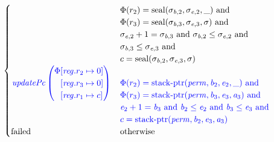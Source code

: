\documentclass[a4paper]{article}
\begin{document}
\begin{align*}
\begin{cases}
&
                                \arraycolsep=0pt
                                \begin{array}[t]{l}
                                  \Phi(r_2) = \seal{\sigma_{\baddr,2},\sigma_{\eaddr,2},\_} \tand \\
                                  \Phi(r_3) = \seal{\sigma_{\baddr,3},\sigma_{\eaddr,3},\sigma} \tand \\
                                  \sigma_{\eaddr,2}+1 = \sigma_{\baddr,3} \tand \sigma_{\baddr,2} \leq \sigma_{\eaddr,2} \tand\\
                                  \sigma_{\baddr,3} \leq \sigma_{\eaddr,3} \tand \\
                                  c = \seal{\sigma_{\baddr,2},\sigma_{\eaddr,3},\sigma}
                                \end{array}\\
                                \sourcecolor\left.
                                \updPcAddr{}\left(
                                \arraycolsep=0pt
                                \begin{array}{r l}
                                  \Phi&\updReg{r_2}{0}\\
                                      &\updReg{r_3}{0}\\
                                      &\updReg{r_1}{c}
                                \end{array}\right)\right.
&
                                \sourcecolor
                                \arraycolsep=0pt
                                \begin{array}[t]{l}
                                  \Phi(r_2) = \stkptr{\perm,\baddr_2,\eaddr_2,\_} \tand \\
                                  \Phi(r_3) = \stkptr{\perm,\baddr_3,\eaddr_3,\aaddr_3} \tand \\
                                  \eaddr_2 + 1 = \baddr_3 \tand \baddr_2 \leq \eaddr_2 \tand \baddr_3 \leq \eaddr_3 \tand \\
                                  c = \stkptr{\perm,\baddr_2,\eaddr_3,\aaddr_3} \\
                                \end{array}\\
                                \failed & \totherwise
                              \end{cases}
\end{align*}
\end{document}

